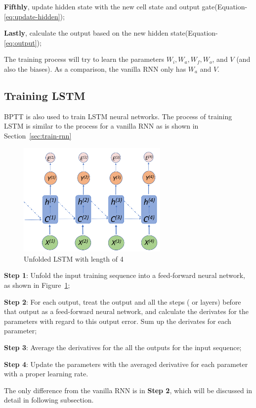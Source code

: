 \documentclass{article}
\begin{document}
\textbf{Fifthly}, update hidden state with the new cell state and output gate(Equation-\ref{eq:update-hidden});

\textbf{Lastly}, calculate the output based on the new hidden state(Equation-\ref{eq:output});

The training process will try to learn the parameters $W_i, W_a, W_f, W_o$, and $V$ (and also the biases). As a comparison, the vanilla RNN
only has $W_a$ and $V$.

\subsection{Training LSTM}
BPTT is also used to train LSTM neural networks. The process of training LSTM is similar to the process for a vanilla RNN as is shown in Section~\ref{sec:train-rnn}

\begin{figure}[htbp]
	\centering
	\includegraphics[width=0.65\textwidth, keepaspectratio]{lstm}
	\caption{Unfolded LSTM with length of 4}
	\label{fig:lstm}
\end{figure}


\textbf{Step 1}: Unfold the input training sequence into a feed-forward neural network, as shown in Figure~\ref{fig:lstm};

\textbf{Step 2}: For each output, treat the output and all the steps ( or layers) before that output as a feed-forward neural network,
and calculate the derivates for the parameters with regard to this output error. Sum up the derivates for each parameter;

\textbf{Step 3}: Average the derivatives for the all the outputs for the input sequence;

\textbf{Step 4}: Update the parameters with the averaged derivative for each parameter with a proper learning rate.

The only difference from the vanilla RNN is in \textbf{Step 2}, which will be discussed in detail in following subsection.
\end{document}
